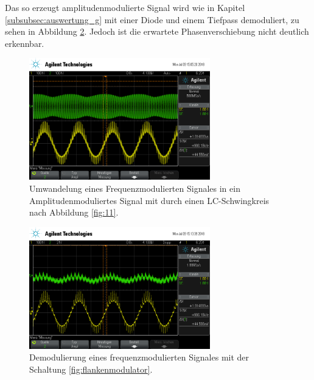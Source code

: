 Das so erzeugt amplitudenmodulierte Signal wird wie in Kapitel \ref{subsubsec:auswertung_g}
mit einer Diode und einem Tiefpass demoduliert, zu sehen in Abbildung \ref{fig:demod_frequenz}.
Jedoch ist die erwartete Phasenverschiebung nicht deutlich erkennbar.


\begin{figure}
  \centering
  \includegraphics[width=0.7\textwidth]{osci/freq_demod_amp.png}
  \caption{Umwandelung eines Frequenzmodulierten Signales in ein Amplitudenmoduliertes
Signal mit durch einen LC-Schwingkreis nach Abbildung \ref{fig:11}.}
\label{fig:freq_zu_amp}
\end{figure}



\begin{figure}
  \centering
  \includegraphics[width=0.7\textwidth]{osci/freq_demod.png}
  \caption{Demodulierung eines frequenzmodulierten Signales
  mit der Schaltung \ref{fig:flankenmodulator}.}
\label{fig:demod_frequenz}
\end{figure}
